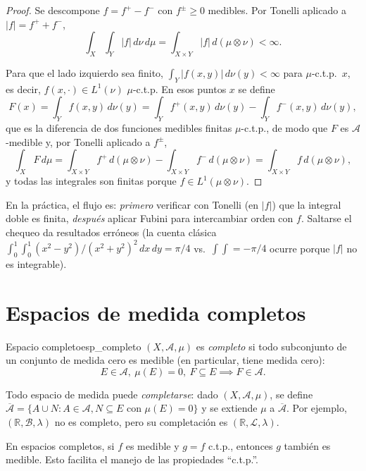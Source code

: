 \documentclass[11pt, a4paper]{article}
\begin{document}
\begin{proof}
Se descompone $f = f^+ - f^-$ con $f^\pm \ge 0$ medibles. Por Tonelli aplicado a $|f| = f^+ + f^-$,
$$ \int_X \!\int_Y |f| \, d\nu \, d\mu = \int_{X \times Y} |f| \, d(\mu \otimes \nu) < \infty. $$

Para que el lado izquierdo sea finito, $\int_Y |f(x, y)| \, d\nu(y) < \infty$ para $\mu$-c.t.p.\
$x$, es decir, $f(x, \cdot) \in L^1(\nu)$ $\mu$-c.t.p. En esos puntos $x$ se define
$$ F(x) = \int_Y f(x, y) \, d\nu(y) = \int_Y f^+(x, y) \, d\nu(y) - \int_Y f^-(x, y) \, d\nu(y), $$
que es la diferencia de dos funciones medibles finitas $\mu$-c.t.p., de modo que $F$ es
$\mathcal{A}$-medible y, por Tonelli aplicado a $f^\pm$,
$$ \int_X F \, d\mu = \int_{X \times Y} f^+ \, d(\mu \otimes \nu) - \int_{X \times Y} f^- \,
d(\mu \otimes \nu) = \int_{X \times Y} f \, d(\mu \otimes \nu), $$
y todas las integrales son finitas porque $f \in L^1(\mu \otimes \nu)$.
\end{proof}

\obs En la práctica, el flujo es: \textit{primero} verificar con Tonelli (en $|f|$) que la
integral doble es finita, \textit{después} aplicar Fubini para intercambiar orden con $f$.
Saltarse el chequeo da resultados erróneos (la cuenta clásica
$\int_0^1 \int_0^1 (x^2 - y^2)/(x^2 + y^2)^2 \, dx \, dy = \pi/4$ vs.\ $\int \int = -\pi/4$ ocurre
porque $|f|$ no es integrable).

\newpage

\section{Espacios de medida completos}

\begin{definicion}{Espacio completo}{esp_completo}
$(X, \mathcal{A}, \mu)$ es \emph{completo} si todo subconjunto de un conjunto de medida cero es
medible (en particular, tiene medida cero):
$$ E \in \mathcal{A}, \ \mu(E) = 0, \ F \subseteq E \implies F \in \mathcal{A}. $$
\end{definicion}

\obs Todo espacio de medida puede \emph{completarse}: dado $(X, \mathcal{A}, \mu)$, se define
$\overline{\mathcal{A}} = \{A \cup N : A \in \mathcal{A}, N \subseteq E \text{ con } \mu(E) = 0\}$
y se extiende $\mu$ a $\overline{\mathcal{A}}$. Por ejemplo, $(\mathbb{R}, \mathcal{B}, \lambda)$
no es completo, pero su completación es $(\mathbb{R}, \mathcal{L}, \lambda)$.

\obs En espacios completos, si $f$ es medible y $g = f$ c.t.p., entonces $g$ también es medible.
Esto facilita el manejo de las propiedades ``c.t.p.''.
\end{document}
